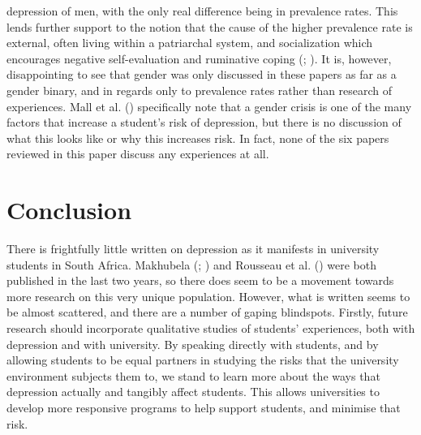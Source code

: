 \documentclass[stu,a4paper,12pt,donotrepeattitle]{apa7}
\begin{document}
depression of men, with the only real difference being in prevalence rates. This
lends further support to the notion that the cause of the higher prevalence rate
is external, often living within a patriarchal system, and socialization which
encourages negative self-evaluation and ruminative coping (\cite{makh21b};
\cite{makhdeb16}). It is, however, disappointing to see that gender was only
discussed in these papers as far as a gender binary, and in regards only to
prevalence rates rather than research of experiences. Mall et al.
(\citeyear{malletal18}) specifically note that a gender crisis is one of the
many factors that increase a student's risk of depression, but there is no
discussion of what this looks like or why this increases risk. In fact, none of
the six papers reviewed in this paper discuss any experiences at all.
\section{Conclusion}
There is frightfully little written on depression as it manifests in university
students in South Africa. Makhubela (\citeyear{makh21b}; \cite{makh21}) and
Rousseau et al. (\citeyear{roussetal21}) were both published in the last two
years, so there does seem to be a movement towards more research on this very
unique population. However, what is written seems to be almost scattered, and
there are a number of gaping blindspots. Firstly, future research should
incorporate qualitative studies of students' experiences, both with depression
and with university. By speaking directly with students, and by allowing students
to be equal partners in studying the risks that the university environment
subjects them to, we stand to learn more about the ways that depression
actually and tangibly affect students. This allows universities to develop
more responsive programs to help support students, and minimise that risk.
\newpage
\printbibliography
\end{document}
